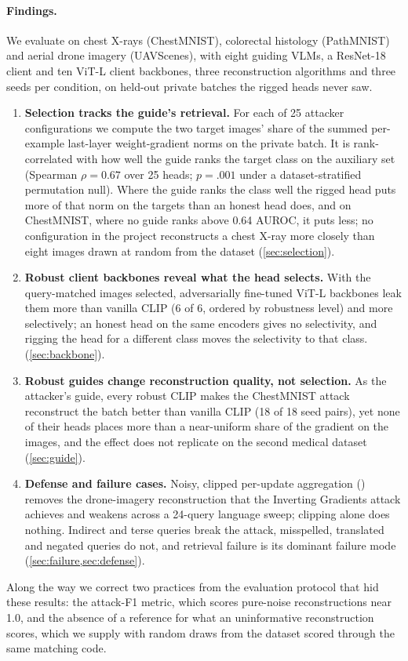 \paragraph{Findings.}
We evaluate \geminio on chest X-rays (ChestMNIST), colorectal histology (PathMNIST) and aerial drone imagery (UAVScenes), with eight guiding VLMs, a ResNet-18 client and ten ViT-L client backbones, three reconstruction algorithms and three seeds per condition, on held-out private batches the rigged heads never saw.
\begin{enumerate}
\itemsep0pt
\item \textbf{Selection tracks the guide's retrieval.} For each of 25 attacker configurations we compute the two target images' share of the summed per-example last-layer weight-gradient norms on the private batch. It is rank-correlated with how well the guide ranks the target class on the auxiliary set (Spearman $\rho=0.67$ over 25 heads; $p=.001$ under a dataset-stratified permutation null). Where the guide ranks the class well the rigged head puts more of that norm on the targets than an honest head does, and on ChestMNIST, where no guide ranks \pneu above 0.64 AUROC, it puts less; no configuration in the project reconstructs a chest X-ray more closely than eight images drawn at random from the dataset (\cref{sec:selection}).
\item \textbf{Robust client backbones reveal what the head selects.} With the query-matched images selected, adversarially fine-tuned ViT-L backbones leak them more than vanilla CLIP (6 of 6, ordered by robustness level) and more selectively; an honest head on the same encoders gives no selectivity, and rigging the head for a different class moves the selectivity to that class.  (\cref{sec:backbone}).
\item \textbf{Robust guides change reconstruction quality, not selection.} As the attacker's guide, every robust CLIP makes the ChestMNIST attack reconstruct the batch better than vanilla CLIP (18 of 18 seed pairs), yet none of their heads places more than a near-uniform share of the gradient on the \pneu images, and the effect does not replicate on the second medical dataset (\cref{sec:guide}).
\item \textbf{Defense and failure cases.} Noisy, clipped per-update aggregation (\nbfu) removes the drone-imagery reconstruction that the Inverting Gradients attack achieves and weakens \geminio across a 24-query language sweep; clipping alone does nothing. Indirect and terse queries break the attack, misspelled, translated and negated queries do not, and retrieval failure is its dominant failure mode (\cref{sec:failure,sec:defense}).
\end{enumerate}
Along the way we correct two practices from the \geminio evaluation protocol that hid these results: the attack-F1 metric, which scores pure-noise reconstructions near 1.0, and the absence of a reference for what an uninformative reconstruction scores, which we supply with random draws from the dataset scored through the same matching code.
